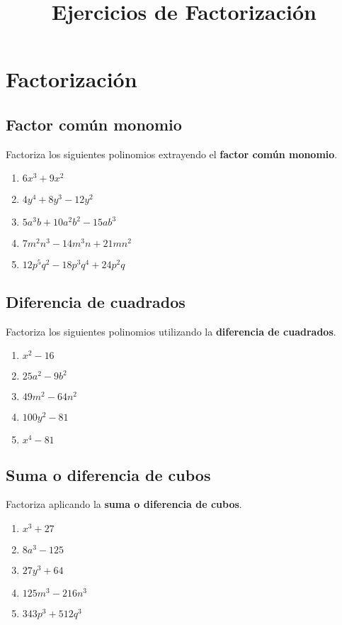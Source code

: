 \documentclass{profesor}
\title{Ejercicios de Factorización}
\begin{document}
\maketitle
\tableofcontents
\newpage

\section{Factorización}

\subsection{Factor común monomio}
Factoriza los siguientes polinomios extrayendo el \textbf{factor común monomio}.
\begin{enumerate}
    \item $6x^3 + 9x^2$
    \item $4y^4 + 8y^3 - 12y^2$
    \item $5a^3b + 10a^2b^2 - 15ab^3$
    \item $7m^2n^3 - 14m^3n + 21mn^2$
    \item $12p^5q^2 - 18p^3q^4 + 24p^2q$
\end{enumerate}

\subsection{Diferencia de cuadrados}
Factoriza los siguientes polinomios utilizando la \textbf{diferencia de cuadrados}.
\begin{enumerate}
    \item $x^2 - 16$
    \item $25a^2 - 9b^2$
    \item $49m^2 - 64n^2$
    \item $100y^2 - 81$
    \item $x^4 - 81$
\end{enumerate}

\subsection{Suma o diferencia de cubos}
Factoriza aplicando la \textbf{suma o diferencia de cubos}.
\begin{enumerate}
    \item $x^3 + 27$
    \item $8a^3 - 125$
    \item $27y^3 + 64$
    \item $125m^3 - 216n^3$
    \item $343p^3 + 512q^3$
\end{enumerate}
\end{document}
